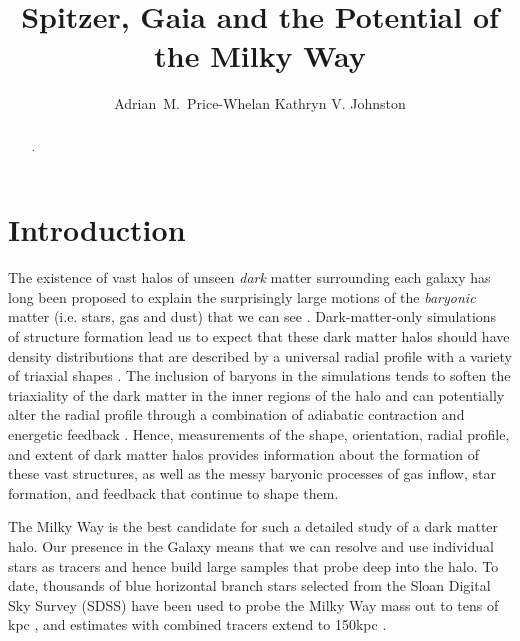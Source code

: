 \documentclass{emulateapj}
\begin{document}
\title{Spitzer, Gaia and the Potential of the Milky Way}

\author{Adrian~M.~Price-Whelan Kathryn V. Johnston}


\begin{abstract}
.
\end{abstract}


\section{Introduction}
\label{intro.sec}
 The existence of vast halos of unseen {\it dark} matter surrounding each galaxy has long been proposed to explain the surprisingly large
motions of the {\it baryonic} matter (i.e. stars, gas and dust) that we can see \citep[e.g.,][]{rubin70}.
Dark-matter-only simulations of structure formation lead us to expect that these dark matter halos should have density distributions that are described by a universal radial profile \citep{navarro96} with a variety of triaxial shapes \citep{jing02}.
The inclusion of baryons in the simulations tends to soften the triaxiality of the dark matter in the inner regions of the halo \citep[e.g., as the disk forms,][]{bailin05} and
can potentially alter the radial profile through a combination of adiabatic contraction and energetic feedback \citep[see recent discussion by][]{pontzen12}.
Hence, measurements of the shape, orientation, radial profile, and extent of dark matter halos provides information about the formation of these vast structures, as well as the messy baryonic processes of gas inflow, star formation, and feedback that continue to shape them.

The Milky Way is the best candidate for such a detailed study of a dark matter halo. 
Our presence in the Galaxy means that we can resolve and use individual stars as tracers and hence build large samples that probe deep into the halo.
To date, thousands of blue horizontal branch stars selected from the Sloan Digital Sky Survey (SDSS) have been used to probe the Milky Way mass out to tens of
kpc \citep[SDSS, see][]{deason12a,kafle12}, and estimates with combined tracers extend to 150kpc \citep{deason12b}.
\end{document}
